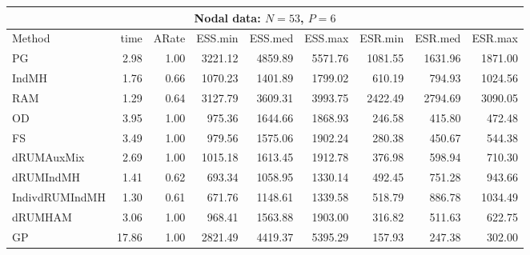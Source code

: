 
\begin{table}
\tablesize
\centering
\begin{tabular}{l r r r r r r r r } 
\hline 
\multicolumn{9}{c}{Nodal data: $N= 53$, $P=6$} \\
\hline 
          Method  &     time &    ARate &  ESS.min &  ESS.med &  ESS.max &  ESR.min &  ESR.med &  ESR.max \\ 
              PG  &     2.98 &     1.00 &  3221.12 &  4859.89 &  5571.76 &  1081.55 &  1631.96 &  1871.00 \\ 
           IndMH  &     1.76 &     0.66 &  1070.23 &  1401.89 &  1799.02 &   610.19 &   794.93 &  1024.56 \\ 
             RAM  &     1.29 &     0.64 &  3127.79 &  3609.31 &  3993.75 &  2422.49 &  2794.69 &  3090.05 \\ 
              OD  &     3.95 &     1.00 &   975.36 &  1644.66 &  1868.93 &   246.58 &   415.80 &   472.48 \\ 
              FS  &     3.49 &     1.00 &   979.56 &  1575.06 &  1902.24 &   280.38 &   450.67 &   544.38 \\ 
      dRUMAuxMix  &     2.69 &     1.00 &  1015.18 &  1613.45 &  1912.78 &   376.98 &   598.94 &   710.30 \\ 
       dRUMIndMH  &     1.41 &     0.62 &   693.34 &  1058.95 &  1330.14 &   492.45 &   751.28 &   943.66 \\ 
  IndivdRUMIndMH  &     1.30 &     0.61 &   671.76 &  1148.61 &  1339.58 &   518.79 &   886.78 &  1034.49 \\ 
         dRUMHAM  &     3.06 &     1.00 &   968.41 &  1563.88 &  1903.00 &   316.82 &   511.63 &   622.75 \\ 
              GP  &    17.86 &     1.00 &  2821.49 &  4419.37 &  5395.29 &   157.93 &   247.38 &   302.00
 \end{tabular}


\end{table}
